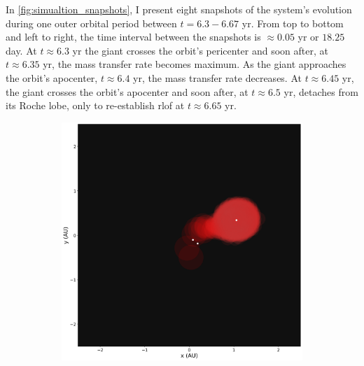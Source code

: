 In \cref{fig:simualtion_snapshots}, I present eight snapshots of the system's evolution during one outer orbital period between $t = 6.3 - 6.67$ yr. From top to bottom and left to right, the time interval between the snapshots is $\approx 0.05$ yr or $18.25$ day. At $t \approx 6.3$ yr the giant crosses the orbit's pericenter and soon after, at $t \approx 6.35$ yr, the mass transfer rate becomes maximum. As the giant approaches the orbit's apocenter, $t \approx 6.4$ yr, the mass transfer rate decreases. At $t \approx 6.45$ yr, the giant crosses the orbit's apocenter and soon after, at $t \approx 6.5$ yr, detaches from its Roche lobe, only to re-establish \ac{rlof} at $t \approx 6.65$ yr.
\newpage
\thispagestyle{empty}
\vspace{-5cm}
\begin{figure}[H]
\vspace{-3cm}
    \centering
    \begin{subfigure}[b]{0.47\textwidth}
        \centering
        \includegraphics[width=\textwidth]{Thesis/graphs/snapshot_0022980.png}   
    \end{subfigure}
    \hfill
    \begin{subfigure}[b]{0.47\textwidth}  
        \centering 

\end{subfigure}
\end{figure}
